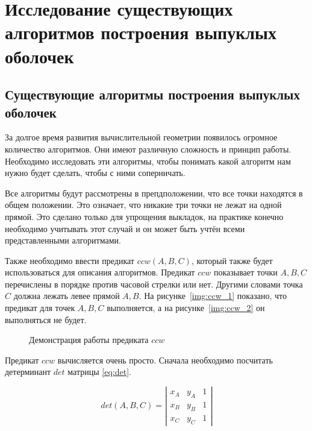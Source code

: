 \chapter{Исследование существующих алгоритмов построения выпуклых оболочек} \label{chapt1}

\section{Существующие алгоритмы построения выпуклых оболочек} \label{sect1_1}

За долгое время развития вычислительной геометрии появилось огромное количество алгоритмов. Они имеют различную сложность и принцип работы. Необходимо исследовать эти алгоритмы, чтобы понимать какой алгоритм нам нужно будет сделать, чтобы с ними соперничать.

Все алгоритмы будут рассмотрены в препдположении, что все точки находятся в общем положении. Это означает, что никакие три точки не лежат на одной прямой. Это сделано только для упрощения выкладок, на практике конечно необходимо учитывать этот случай и он может быть учтён всеми представленными алгоритмами.

Также необходимо ввести предикат $ccw(A, B, C)$, который также будет использоваться для описания алгоритмов. Предикат $ccw$ показывает точки $A, B, C$ перечислены в порядке против часовой стрелки или нет. Другими словами точка $C$ должна лежать левее прямой $A, B$. На рисунке~\ref{img:ccw_1} показано, что предикат для точек $A, B, C$ выполняется, а на рисунке~\ref{img:ccw_2} он выполняться не будет.

\begin{figure}[ht]
	{\centering
		\hfill
		\hfill
		\hfill
	}
	\caption{Демонстрация работы предиката $ccw$}
	\label{img:ccw}
\end{figure}

Предикат $ccw$ вычисляется очень просто. Сначала необходимо посчитать детерминант $det$ матрицы \eqref{eq:det}.

\begin{equation}\label{eq:det}
det(A, B, C)= \left| \begin{array}{ccc} x_A & y_A & 1 \\ x_B & y_B & 1 \\ x_C & y_C & 1  \end{array}\right|
\end{equation}

